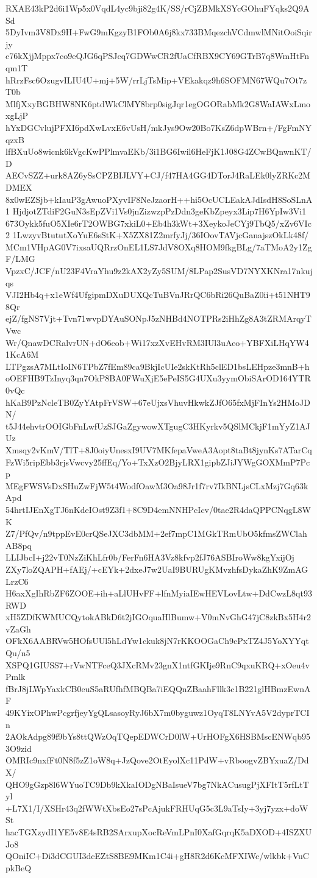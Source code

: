 RXAE43kP2d6i1Wp5x0VqdL4yc9bji82g4K/SS/rCjZBMkXSYcGOhuFYqks2Q9ASd
5DyIvm3V8Dx9H+FwG9mKgzyB1FOb0A6j8kx733BMqezchVCdmwlMNitOoiSqirjy
c76kXjjMppx7co9eQJG6qPSJcq7GDWwCR2fUaCfRBX9CY69GTrB7q8WmHtFnqm1T
hRrzFsc6OzugvILIU4U+mj+5W/rrLjTsMip+VEkakqz9h6SOFMN67WQu7Ot7zT0b
MlfjXxyBGBHW8NK6ptdWkClMY8brp0sigJqr1egOGORabMk2G8WaIAWxLmoxgLjP
hYxDGCvlujPFXI6pdXwLvxE6vUsH/mkJys9Ow20Bo7KsZ6dpWBrn+/FgFmNYqzxB
lfBXuUo8wicnk6kVgcKwPPlmvaEKb/3i1BG6Iwil6HeFjK1J08G4ZCwBQnwnKT/D
AECvSZZ+urk8AZ6ySsCPZBIJLVY+CJ/f47HA4GG4DTorJ4RaLEk0lyZRKc2MDMEX
8x0wEZSjb+kIauP3gAwuoPXyvIF8NeJzaorH++hi5OcUCLEakAJdIsdH8SoSLnA1
HjdjotZTdiF2GuN3sEpZVi1Vs0jnZizwzpPzDdn3geKbZpeyx3Lip7H6YpIw3Vi1
673Oykk5fuO5XIe6rT2OWBG7xkiL0+Eb4h3kWt+3XeykoJeCYj9TbQ5/xZv6VIc2
1LwzyvBtututXoYuE6sStK+X5ZX81Z2mrfyJj/36IOovTAVjcGanajszOkLk48f/
MCm1VHpAG0V7ixsaUQRrzOnEL1LS7JdV8OXq8HOM9fkgBLg/7aTMoA2y1ZgF/LMG
VpzxC/JCF/nU23F4VraYhu9z2kAX2yZy5SUM/8LPap2SusVD7NYXKNra17nkujqs
VJI2Hb4q+x1eWf4UfgipmDXuDUXQcTuBVnJRrQC6bRi26QuBaZ0ii+t51NHT98Qr
ejZ/fgNS7Vjt+Tvn71wvpDYAuSONpJ5zNHBd4NOTPRs2iHhZg8A3tZRMArqyTVwc
Wr/QnawDCRalvrUN+dO6cob+Wi17xzXvEHvRM3IUl3uAeo+YBFXiLHqYW41KcA6M
LTPgzsA7MLtIoIN6TPbZ7fEm89ca9BkjIcUIe2skKtRh5clED1bsLEHpze3mnB+h
oOEFHB9TzInyq3qn7OkP8BA0FWuXjE5ePeIS5G4UXu3yymObiSArOD164YTR0vQc
hKaB9PzNcleTB0ZyYAtpFrVSW+67eUjxsVhuvHkwkZJfO65fxMjFInYs2HMoJDN/
t5J44ehvtrOOIGbFnLwfUzSJGaZgywowXTgugC3HKyrkv5QSlMCkjF1mYyZ1AJUz
Xmsqy2vKmV/TlT+8J0oiyUnesxI9UV7MKfepaVweA3Aopt8taBt8jynKs7ATarCq
FzWi5ripEbb3rjsVwcvy25ffEq/Yo+TxXzO2BjyLRX1gipbZJiJYWgGOXMmP7Pcp
MEgFWSVsDxSHuZwFjW5t4WodfOawM3Oa98Jr1f7rv7IkBNLjsCLxMzj7Gq63kApd
54hrtIJEnXgTJ6nKdeIOst9Z3f1+8C9D4emNNHPcIcv/0tae2R4daQPPCNqgL8WK
Z7/PfQv/n9tppEvE0crQSeJXC3dbMM+2ef7mpC1MGkTRmUbO5kfmsZWClahAB8pq
LLIJbcI+j22vT0NzZiKhLfr0b/FerFn6HA3Vz8kfvp2fJ76ASBIroWw8kgYxijOj
ZXy7loZQAPH+fAEj/+cEYk+2dxeJ7w2UaI9BURUgKMvzhfsDykaZhK9ZmAGLrzC6
H6axXgIhRbZF6ZOOE+ih+aLlUHvFF+lfnMyiaIEwHEVLovLtw+DdCwzL8qt93RWD
xH5ZDfKWMUCQytokABkD6t2jIGOquaHlBumw+V0mNvGhG47jC8zkBx5H4r2vZaGh
OFkX6AABRVw5HOfsUUl5hLdYw1ckuk8jN7rKKOOGaCh9cPxTZ4J5YoXYYqtQu/n5
XSPQ1GIUSS7+rVwNTFceQ3JXcRMv23gnX1ntfGKIje9RnC9qxuKRQ+xOeu4vPmlk
fBrJ8jLWpYaxkCB0euS5aRUfhfMBQBa7iEQQnZBaahFllk3c1B221glHBmzEwnAF
49KYixOPhwPcgrfjeyYgQLsasoyRyJ6bX7m0byguwz1OyqT8LNYvA5V2dyprTCIn
2AOkAdpg89f9bYs8ttQWzOqTQepEDWCrD0lW+UrHOFgX6HSBMscENWqb953O9zid
OMRIc9nxfFt0N8f5zZ1oW8q+JzQove2OtEyolXc11PdW+vRboogvZBYxuaZ/DdX/
QHO9gGzp8l6WYuoTC9Db9kXkaIODgNBaIsueV7bg7NkACusugPjXFItT5rfLtTyl
+L7X1/I/XSHr43q2fWWtXbsEo27sPcAjukFRHUqG5c3L9aTsIy+3yj7yzx+doWSt
hacTGXzydI1YE5v8E4sRB2SArxupXocReVmLPnI0XafGqrqK5aDXOD+4ISZXUJo8
QOniIC+Di3dCGUI3dcEZtS8BE9MKm1C4i+gH8R2d6KcMFXIWc/wlkbk+VuCpkBeQ
